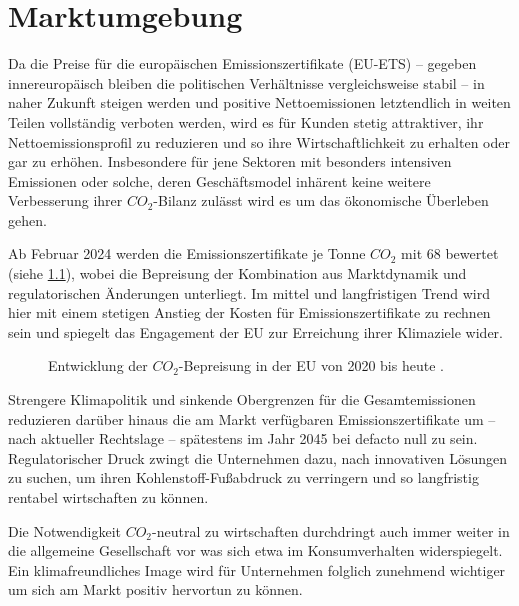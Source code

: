 \chapter{Marktumgebung}

Da die Preise für die europäischen Emissionszertifikate (EU-ETS) -- gegeben innereuropäisch bleiben die politischen Verhältnisse vergleichsweise stabil -- in naher Zukunft steigen werden und positive Nettoemissionen letztendlich in weiten Teilen vollständig verboten werden, wird es für Kunden stetig attraktiver, ihr Nettoemissionsprofil zu reduzieren und so ihre Wirtschaftlichkeit zu erhalten oder gar zu erhöhen.
Insbesondere für jene Sektoren mit besonders intensiven Emissionen oder solche, deren Geschäftsmodel inhärent keine weitere Verbesserung ihrer \(CO_2\)-Bilanz zulässt wird es um das ökonomische Überleben gehen.

Ab Februar 2024 werden die Emissionszertifikate je Tonne \(CO_2\) mit \qty{68}{\EUR} bewertet (siehe \cref{fig:carbon price tracker}), wobei die Bepreisung der Kombination aus Marktdynamik und regulatorischen Änderungen unterliegt.
Im mittel und langfristigen Trend wird hier mit einem stetigen Anstieg der Kosten für Emissionszertifikate zu rechnen sein und spiegelt das Engagement der EU zur Erreichung ihrer Klimaziele wider.

\begin{figure}[h]
    \centering
    
    \caption[Entwicklung der \(CO_2\)-Bepreisung in der EU]{Entwicklung der \(CO_2\)-Bepreisung in der EU von 2020 bis heute \cite{Statista2023.AvPriceEUETS}.}\label{fig:carbon price tracker}
\end{figure}

Strengere Klimapolitik und sinkende Obergrenzen für die Gesamtemissionen reduzieren darüber hinaus die am Markt verfügbaren Emissionszertifikate um -- nach aktueller Rechtslage -- spätestens im Jahr 2045 bei defacto null zu sein.
Regulatorischer Druck zwingt die Unternehmen dazu, nach innovativen Lösungen zu suchen, um ihren Kohlenstoff-Fußabdruck zu verringern und so langfristig rentabel wirtschaften zu können.

Die Notwendigkeit \(CO_2\)-neutral zu wirtschaften durchdringt auch immer weiter in die allgemeine Gesellschaft vor was sich etwa im Konsumverhalten widerspiegelt.
Ein klimafreundliches Image wird für Unternehmen folglich zunehmend wichtiger um sich am Markt positiv hervortun zu können.\par\medskip

